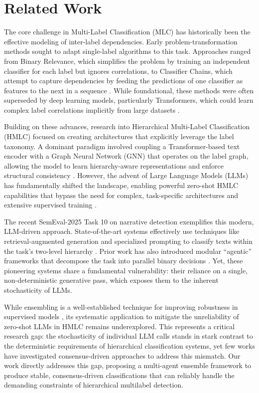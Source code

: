 \section{Related Work}

The core challenge in Multi-Label Classification (MLC) has historically been the effective modeling of inter-label dependencies. Early problem-transformation methods sought to adapt single-label algorithms to this task. Approaches ranged from Binary Relevance, which simplifies the problem by training an independent classifier for each label but ignores correlations, to Classifier Chains, which attempt to capture dependencies by feeding the predictions of one classifier as features to the next in a sequence \citep{zhang_binary_2018,Read2011}. While foundational, these methods were often superseded by deep learning models, particularly Transformers, which could learn complex label correlations implicitly from large datasets \citep{devlin_bert_2019}.

Building on these advances, research into Hierarchical Multi-Label Classification (HMLC) focused on creating architectures that explicitly leverage the label taxonomy. A dominant paradigm involved coupling a Transformer-based text encoder with a Graph Neural Network (GNN) that operates on the label graph, allowing the model to learn hierarchy-aware representations and enforce structural consistency \citep{zhou-etal-2020-hierarchy,xu-etal-2021-hierarchical}. However, the advent of Large Language Models (LLMs) has fundamentally shifted the landscape, enabling powerful zero-shot HMLC capabilities that bypass the need for complex, task-specific architectures and extensive supervised training \citep{wang-etal-2023-text2topic}.

The recent SemEval-2025 Task 10 on narrative detection \citep{semeval2025task10} exemplifies this modern, LLM-driven approach. State-of-the-art systems effectively use techniques like retrieval-augmented generation and specialized prompting to classify texts within the task's two-level hierarchy \citep{singh-etal-2025-gatenlp,younus-qureshi-2025-nlptuducd}. Prior work has also introduced modular ``agentic'' frameworks that decompose the task into parallel binary decisions \citep{eljadiri-nurbakova-2025-team}. Yet, these pioneering systems share a fundamental vulnerability: their reliance on a single, non-deterministic generative pass, which exposes them to the inherent stochasticity of LLMs. 

While ensembling is a well-established technique for improving robustness in supervised models \citep{jurkiewicz-etal-2020-applicaai}, its systematic application to mitigate the unreliability of zero-shot LLMs in HMLC remains underexplored. This represents a critical research gap: the stochasticity of individual LLM calls stands in stark contrast to the deterministic requirements of hierarchical classification systems, yet few works have investigated consensus-driven approaches to address this mismatch. Our work directly addresses this gap, proposing a multi-agent ensemble framework to produce stable, consensus-driven classifications that can reliably handle the demanding constraints of hierarchical multilabel detection.
